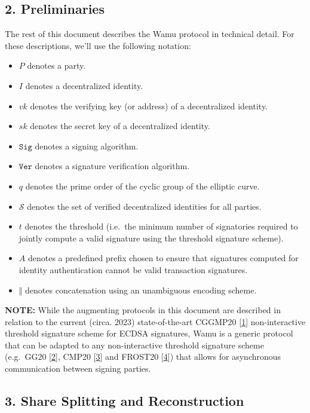 \documentclass[
]{article}
\providecommand{\tightlist}{%
  \setlength{\itemsep}{0pt}\setlength{\parskip}{0pt}}
\begin{document}
\hypertarget{preliminaries}{%
\subsection{2. Preliminaries}\label{preliminaries}}

The rest of this document describes the Wamu protocol in technical
detail. For these descriptions, we'll use the following notation:

\begin{itemize}
\tightlist
\item
  \(P\) denotes a party.
\item
  \(I\) denotes a decentralized identity.
\item
  \(vk\) denotes the verifying key (or address) of a decentralized
  identity.
\item
  \(sk\) denotes the secret key of a decentralized identity.
\item
  \(\mathtt{Sig}\) denotes a signing algorithm.
\item
  \(\mathtt{Ver}\) denotes a signature verification algorithm.
\item
  \(q\) denotes the prime order of the cyclic group of the elliptic
  curve.
\item
  \(\mathcal{S}\) denotes the set of verified decentralized identities
  for all parties.
\item
  \(t\) denotes the threshold (i.e.~the minimum number of signatories
  required to jointly compute a valid signature using the threshold
  signature scheme).
\item
  \(A\) denotes a predefined prefix chosen to ensure that signatures
  computed for identity authentication cannot be valid transaction
  signatures.
\item
  \(\Vert\) denotes concatenation using an unambiguous encoding scheme.
\end{itemize}

\textbf{NOTE:} While the augmenting protocols in this document are
described in relation to the current (circa. 2023) state-of-the-art
CGGMP20 {[}\protect\hyperlink{ref-cggmp20}{1}{]} non-interactive
threshold signature scheme for ECDSA signatures, Wamu is a generic
protocol that can be adapted to any non-interactive threshold signature
scheme (e.g.~GG20 {[}\protect\hyperlink{ref-gg20}{2}{]}, CMP20
{[}\protect\hyperlink{ref-cmp20}{3}{]} and FROST20
{[}\protect\hyperlink{ref-frost20}{4}{]}) that allows for asynchronous
communication between signing parties.

\hypertarget{share-splitting-and-reconstruction}{%
\subsection{3. Share Splitting and
Reconstruction}\label{share-splitting-and-reconstruction}}
\end{document}
